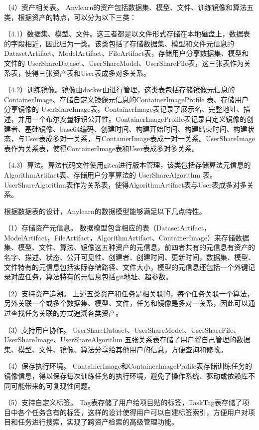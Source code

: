 （4）资产相关表。
Anylearn的资产包括数据集、模型、文件、训练镜像和算法五类，根据资产的特点，可以分为以下三类：

（4.1）数据集、模型、文件。这三者都是以文件形式存储在本地磁盘上，数据表的字段相近，因此归为一类。该类包括了存储数据集、模型和文件元信息的 DatasetArtifact、ModelArtifact、FileArtifact表，存储用户分享数据集、模型和文件的 UserShareDataset、UserShareModel、UserShareFile表，这三张表作为关系表，使得三张资产表和User表成多对多关系。

（4.2）训练镜像。镜像由docker由进行管理，这类表包括存储镜像元信息的 ContainerImage、存储自定义镜像元信息的ContainerImageProfile 表、存储用户分享镜像的 UserShareImage表。ContainerImage表记录了展示名、完整地址、描述，并用一个布尔变量标识公开性。ContainerImageProfile表记录自定义镜像的创建者、基础镜像、base64编码、创建时间、构建开始时间、构建结束时间、构建状态，与User表成多对一关系，与ContainerImage表成一对一关系。UserShareImage表作为关系表，使得ContainerImage表和User表成多对多关系。

（4.3）算法。算法代码文件使用gitea进行版本管理，该类包括存储算法元信息的 AlgorithmArtifact表、存储用户分享算法的 UserShareAlgorithm 表。UserShareAlgorithm表作为关系表，使得AlgorithmArtifact表与User表成多对多关系。

根据数据表的设计，Anylearn的数据模型能够满足以下几点特性。

（1）存储资产元信息。 
数据模型包含相应的表（DatasetArtifact，ModelArtifact，FileArtifact，AlgorithmArtifact、ContainerImage）来存储数据集、模型、文件、算法、镜像这五种资产的元信息，前四者共有的元信息有资产的名字、描述、状态、公开可见性、创建者、创建时间、更新时间，数据集、模型、文件特有的元信息包括实际存储路径、文件大小，模型的元信息还包括一个外键记录对应任务，算法特有的元信息包括git地址、超参数。

（2）支持资产追溯。
上述五类资产和任务是相关联的，每个任务关联一个算法，另外关联一个或多个数据集、模型、文件，任务和镜像是多对一关系，因此可以通过查找任务关联的方式追溯各类资产。

（3）支持用户协作。
UserShareDataset、UserShareModel、UserShareFile、UserShareImage、UserShareAlgorithm 五张关系表存储了用户将自己管理的数据集、模型、文件、镜像、算法分享给其他用户的信息，方便查询和修改。

（4）保存执行环境。
ContainerImage和ContainerImageProfile表存储训练任务的镜像信息，得以保存每次训练任务的执行环境，避免了操作系统、驱动或依赖库不同可能带来的可复现性问题。

（5）支持自定义标签。
Tag表存储了用户给项目贴的标签，TaskTag表存储了项目中各个任务含有的标签，这样的设计使得用户可以自建标签索引，方便用户对项目和任务进行搜索，实现了跨资产检索的高级管理功能。

